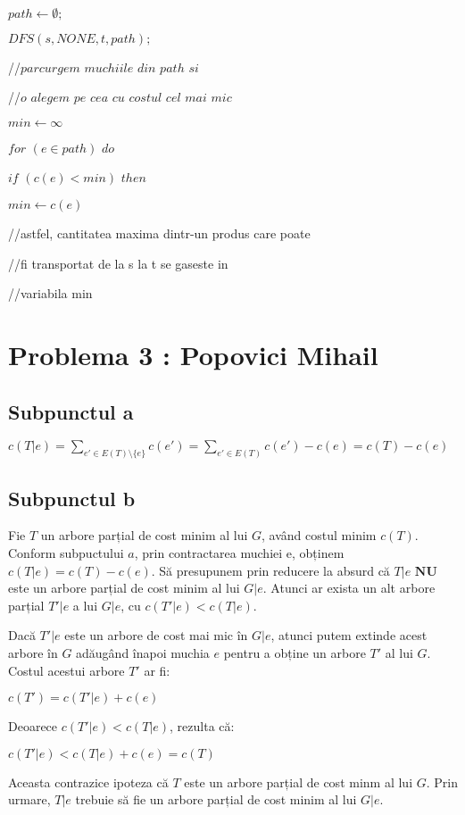 \documentclass{article}
\begin{document}
{{{    \\
    \par $path \leftarrow \emptyset;$
    \par $DFS(s, NONE, t, path);$
    \\
    \par //$parcurgem$ $muchiile$ $din$ $path$ $si$ 
    \par //$o$ $alegem$ $pe$ $cea$ $cu$ $costul$ $cel$ $mai$ $mic$
    \par $min \leftarrow \infty$
    \par $for$  $(e\in path)$ $do$
    \par \hspace*{1cm} $if$ $(c(e)<min)$ $then$
    \par \hspace*{1.5cm} $min \leftarrow c(e)$
    \par //astfel, cantitatea maxima dintr-un produs care poate
    \par //fi transportat de la s la t se gaseste in 
    \par //variabila min 

}

\section*{\fontsize{20}{50}\selectfont Problema 3 : Popovici Mihail}
\subsection*{\fontsize{16}{30}\selectfont Subpunctul a}
{\fontsize{14}{16}\selectfont 

\centerline {$ c(T|e) = \sum_{ e'\in E(T)\setminus \lbrace e \rbrace } c(e') = \sum_{ e'\in E(T) } c(e') - c(e) = c(T) - c(e)$ }
}

\subsection*{\fontsize{16}{30}\selectfont Subpunctul b}
{\fontsize{14}{16}\selectfont 
    Fie $T$ un arbore parțial de cost minim al lui $G$, având costul minim $c(T)$. Conform subpuctului $a$, prin contractarea muchiei e, obținem $c(T|e) = c(T) - c(e)$.
    Să presupunem prin reducere la absurd că $T|e$ $\mathbf{N} \mathbf{U}$ este un arbore parțial de cost minim al lui $G|e$. Atunci ar exista un alt arbore parțial $T'|e$ a lui $G|e$, cu $c(T'|e) < c(T|e)$.
    \par Dacă $T'|e$ este un arbore de cost mai mic în $G|e$, atunci putem extinde acest arbore în $G$ adăugând înapoi muchia $e$ pentru a obține un arbore $T'$ al lui $G$. Costul acestui arbore $T'$ ar fi:
    \par \centerline { $c(T') = c(T'|e) + c(e)$ }
    \par Deoarece $c(T'|e) < c(T|e)$, rezulta că:
    \par \centerline {$c(T'|e) < c(T|e) + c(e) = c(T) $}
    \par Aceasta contrazice ipoteza că $T$ este un arbore parțial de cost minm al lui $G$. Prin urmare, $T|e$ trebuie să fie un arbore parțial de cost minim al lui $G|e$.
    }

}}
\end{document}
